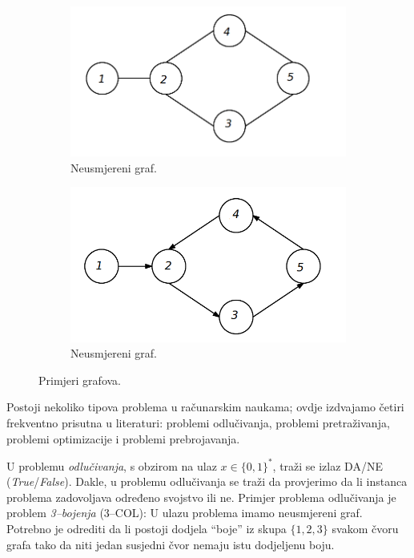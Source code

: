  
  \begin{figure}
      \centering
  	
  	  \begin{subfigure}[b]{0.45\textwidth}
  			\includegraphics[width=\textwidth]{slike/undirected-graph.png}
      		\caption{Neusmjereni graf. }
  			\label{fig:neusmjeren-graf}
  		\end{subfigure}
  		\hfil
  		\begin{subfigure}[b]{0.45\textwidth}
  			\includegraphics[width=\textwidth]{slike/directed-graph.png}
      		\caption{Neusmjereni graf. }
			\label{fig:usmjeren-graf}
  		\end{subfigure}
  	
  		\caption{Primjeri grafova.}
  		\label{fig:graphs}
  \end{figure}
 
 Postoji nekoliko tipova problema u računarskim naukama; ovdje izdvajamo četiri frekventno prisutna u literaturi: problemi odlučivanja, problemi pretraživanja, problemi optimizacije i problemi prebrojavanja. 
 
 U problemu \textit{odlučivanja}, s obzirom na ulaz $x \in \{0, 1\}^*$, traži se izlaz DA/NE (\emph{True}/\emph{False}). Dakle, u problemu odlučivanja se traži da provjerimo da li instanca problema zadovoljava određeno svojstvo ili ne. Primjer problema odlučivanja je problem \textit{3--bojenja} (3--COL):
 U ulazu problema imamo neusmjereni graf. Potrebno je odrediti da li postoji dodjela   ``boje''  iz skupa $\{1, 2, 3\}$ svakom čvoru grafa tako da niti jedan susjedni čvor nemaju istu dodjeljenu boju.
 
